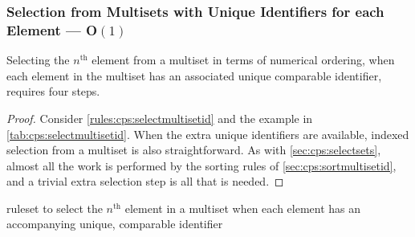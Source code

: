 \subsubsection{Selection from Multisets with Unique Identifiers for each Element --- O\((1)\)}\label{sec:cps:selectmultisetid}

\begin{proposition}\label{prop:cps:selectmultisetid}
Selecting the \(n^{\text{th}}\) element from a multiset in terms of numerical ordering, when each element in the multiset has an associated unique comparable identifier, requires four steps.
\end{proposition}

\begin{proof}
Consider \cref{rules:cps:selectmultisetid} and the example in \cref{tab:cps:selectmultisetid}.  When the extra unique identifiers are available, indexed selection from a multiset is also straightforward. As with \cref{sec:cps:selectsets}, almost all the work is performed by the sorting rules of \cref{sec:cps:sortmultisetid}, and a trivial extra selection step is all that is needed.
\end{proof}

\begin{cprulesetfloat} \begin{cpruleset}



\end{cpruleset}
\caption{\label{rules:cps:selectmultisetid}\Gls{ruleset} to select the \(n^{\text{th}}\) element in a multiset when each element has an accompanying unique, comparable identifier}
\end{cprulesetfloat}

